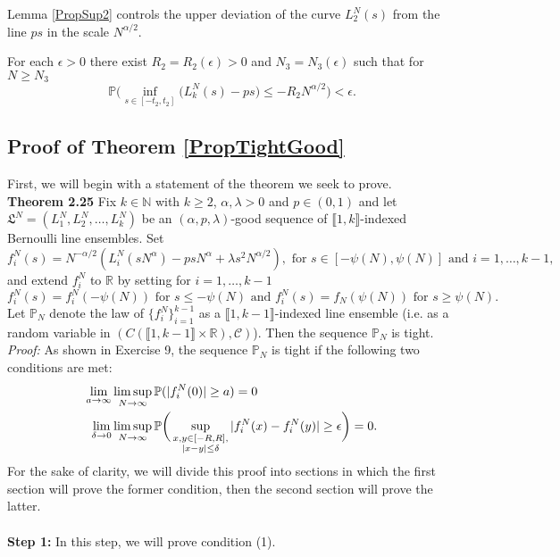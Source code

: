 Lemma \ref{PropSup2} controls the upper deviation of the curve $L^N_2(s)$ from the line $ps$ in the scale $N^{\alpha/2}$.
\begin{lemma}\label{PropSup2} For each $\epsilon > 0$ there exist $R_2=R_2( \epsilon) > 0$ and $N_3=N_3(\epsilon)$ such that for $N \geq N_3$
$$\mathbb{P}\Big( \inf_{s \in [ -t_2, t_2 ]}\big(L^N_k(s) - p s \big) \leq - R_2N^{\alpha/2} \Big) < \epsilon.$$
\end{lemma}




%
\subsection{Proof of Theorem \ref{PropTightGood} }\label{Section4.2}
	First, we will begin with a statement of the theorem we seek to prove. \\
	
	\noindent\textbf{Theorem 2.25}
	Fix $k \in \mathbb{N}$ with $k \geq 2$, $\alpha, \lambda > 0$ and $p \in (0,1)$ and let $\mathfrak{L}^N = (L^N_1, L^N_2, \dots, L^N_k)$ be an $(\alpha, p, \lambda)$-good sequence of $\llbracket 1, k \rrbracket$-indexed Bernoulli line ensembles.  Set
	$$f^N_i(s) =  N^{-\alpha/2}(L^N_i(sN^{\alpha}) - p s N^{\alpha} + \lambda s^2 N^{\alpha/2}), \mbox{ for $s\in [-\psi(N) ,\psi(N)]$ and $i = 1,\dots, k -1$,}$$
	and extend $f^N_i$ to $\mathbb{R}$ by setting for $i = 1, \dots, k - 1$
	$$f^N_i(s) = f^N_i(-\psi(N)) \mbox{ for $s \leq -\psi(N)$ and } f^N_i(s) = f_N(\psi(N)) \mbox{ for $s \geq \psi(N)$}.$$
	Let $\mathbb{P}_N$ denote the law of $\{f^N_i\}_{i = 1}^{k-1}$ as a $\llbracket 1, k-1 \rrbracket$-indexed line ensemble (i.e. as a random variable in $(C( \llbracket 1, k -1 \rrbracket \times \mathbb{R}), \mathcal{C})$). Then the sequence $\mathbb{P}_N$ is tight.\\
	
	\noindent \textit{Proof:} As shown in Exercise 9, the sequence $\mathbb{P}_N$ is tight if the following two conditions are met:
	\begin{align}
	\lim_{a\to\infty} &\limsup_{N\to\infty} \mathbb{P}(|f^N_i(0)|\geq a) = 0\\
	\lim_{\delta\to 0} &\limsup_{N\to\infty} \mathbb{P}\bigg(\sup_{\substack{x,y\in [-R,R], \\ |x-y|\leq\delta}} |f^N_i(x) - f^N_i(y)| \geq \epsilon\bigg)= 0.
	\end{align}
	For the sake of clarity, we will divide this proof into sections in which the first section will prove the former condition, then the second section will prove the latter.
	\\\\\noindent \textbf{Step 1:} In this step, we will prove condition (1).
	
